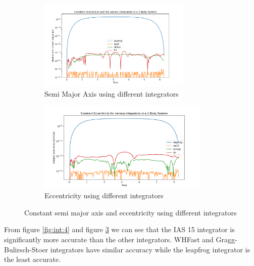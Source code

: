\documentclass[12pt,a4paper]{article}
\begin{document}
\begin{figure}[H]
  \centering
  \begin{subfigure}{0.49\textwidth}
    \includegraphics[height = 1.7in]{2Body/2Body_const_a_int.png}
    \caption{Semi Major Axis using different integrators}
    \label{fig:int_a}  
  \end{subfigure}
  \begin{subfigure}{0.49\textwidth}
    \includegraphics[height = 1.7in]{2Body/2Body_const_ecc_int.png}
    \caption{Eccentricity using different integrators} 
    \label{fig:int_ecc}  
  \end{subfigure}
  \caption{Constant semi major axis and eccentricity using different integrators}
  \label{fig:int:5}
\end{figure}

From figure \ref{fig:int:4} and figure \ref{fig:int:5} we can see that the IAS 15 integrator is significantly more accurate than the other integrators. WHFast and Gragg-Bulirsch-Stoer integrators have similar accuracy while
 the leapfrog integrator is the least accurate.
\end{document}
